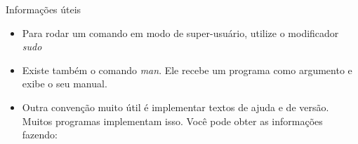 \documentclass{beamer}
\begin{document}
\begin{frame}{Informações úteis}
  \begin{itemize}
  \item Para rodar um comando em modo de super-usuário, utilize o modificador
    \emph{sudo}
  \item Existe também o comando \emph{man}. Ele recebe um programa como
    argumento e exibe o seu manual.
  \item Outra convenção muito útil é implementar textos de ajuda e de versão.
    Muitos programas implementam isso. Você pode obter as informações fazendo:
  \end{itemize}
  \begin{center}
    \begin{shell}
       \\
       \\
    \end{shell}
  \end{center}
\end{frame}



\begin{frame}
  \begin{center}
    \begin{shell}
       \\
       \\
       \\
       \\
       \\
    \end{shell}
  \end{center}
\end{frame}
\end{document}
